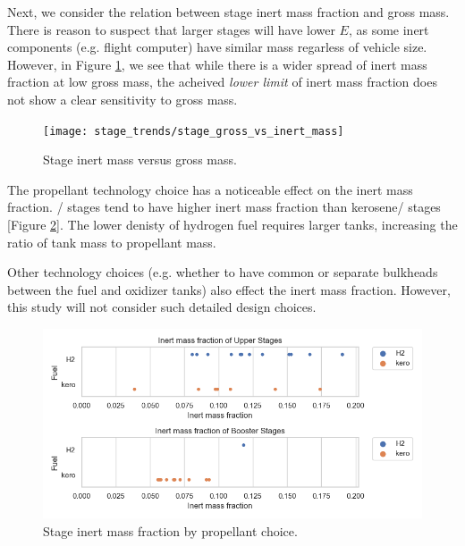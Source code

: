 \documentclass[conf]{../new-aiaa}
\begin{document}
Next, we consider the relation between stage inert mass fraction and gross mass. There is reason to suspect that larger stages will have lower $E$, as some inert components (e.g. flight computer) have similar mass regarless of vehicle size. However, in Figure \ref{fig:stage_gross_vs_inert_mass}, we see that while there is a wider spread of inert mass fraction at low gross mass, the acheived \emph{lower limit} of inert mass fraction does not show a clear sensitivity to gross mass.

\begin{figure}[hbt!]
    \centering
    \texttt{[image: stage\_trends/stage\_gross\_vs\_inert\_mass]}
    \caption{\label{fig:stage_gross_vs_inert_mass} Stage inert mass versus gross mass.}
\end{figure}

The propellant technology choice has a noticeable effect on the inert mass fraction. / stages tend to have higher inert mass fraction than kerosene/ stages [Figure \ref{fig:stage_inert_mass_fuel}]. The lower denisty of hydrogen fuel requires larger tanks, increasing the ratio of tank mass to propellant mass.

Other technology choices (e.g. whether to have common or separate bulkheads between the fuel and oxidizer tanks) also effect the inert mass fraction. However, this study will not consider such detailed design choices.

\begin{figure}[hbt!]
    \centering
    \includegraphics[width=1\textwidth]{stage_trends/stage_inert_mass_fuel}
    \caption{\label{fig:stage_inert_mass_fuel} Stage inert mass fraction by propellant choice.}
\end{figure}
\end{document}
